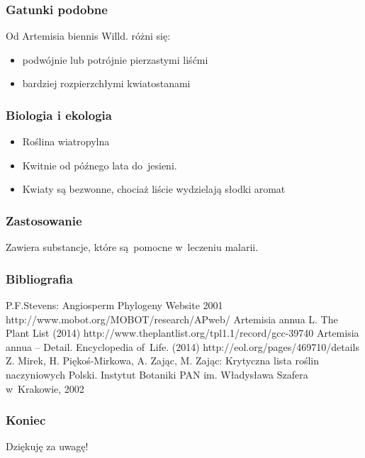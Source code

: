 \documentclass{beamer}
\begin{document}
\begin{frame}
	\frametitle{Gatunki podobne}
	Od Artemisia biennis Willd. różni się:
	\begin{itemize}
	\item podwójnie lub potrójnie pierzastymi liśćmi 
	\pause
	\item bardziej rozpierzchłymi kwiatostanami
	\end{itemize}
\end{frame}

\begin{frame}
	\frametitle{Biologia i ekologia}
	\begin{itemize}
		\item Roślina wiatropylna
		\pause
		\item Kwitnie od późnego lata do~jesieni.
		\pause
		\item Kwiaty są bezwonne, chociaż liście wydzielają słodki aromat
	\end{itemize}
\end{frame}

\begin{frame}
	\frametitle{Zastosowanie}
Zawiera substancje, które są~pomocne w~leczeniu malarii.
\end{frame}

\begin{frame}
	\frametitle{Bibliografia}
	\begin{thebibliography}{9}
		P.F.Stevens: Angiosperm Phylogeny Website 2001 http://www.mobot.org/MOBOT/research/APweb/
		Artemisia annua L. The Plant List (2014) http://www.theplantlist.org/tpl1.1/record/gcc-39740
		Artemisia annua – Detail. Encyclopedia of~Life. (2014) http://eol.org/pages/469710/details
		Z. Mirek, H. Piękoś-Mirkowa, A. Zając, M. Zając: Krytyczna lista roślin naczyniowych Polski. Instytut Botaniki PAN im. Władysława Szafera w~Krakowie, 2002
		
	\end{thebibliography}
\end{frame}


\begin{frame}
	\frametitle{Koniec}
	\begin{center}
	Dziękuję za uwagę!
	\end{center}
\end{frame}	
	
\end{document}
